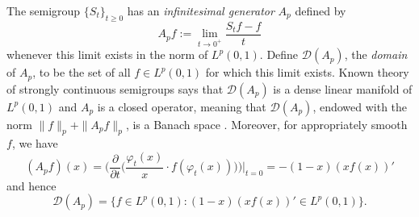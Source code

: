 \documentclass[11pt]{amsart}
\numberwithin{equation}{section}
\theoremstyle{plain}
\theoremstyle{definition}
\renewcommand{\leq}{\leqslant}
\renewcommand{\geq}{\geqslant}
\renewcommand{\phi}{\varphi}
\newcommand{\0}{{\color{lightgray}0}}
\begin{document}
The semigroup $\{S_t\}_{t \geq 0}$ has an  {\em infinitesimal generator} $A_p$ defined by 
$$A_p f := \lim_{t \to 0^{+}} \frac{S_{t} f - f}{t}$$ whenever this limit exists in the norm of $L^p(0, 1)$. Define $\mathcal{D}(A_p)$, the {\em domain} of $A_p$, to be the set of all $f \in L^p(0, 1)$ for which this limit exists. Known theory of strongly continuous semigroups says that $\mathcal{D}(A_p)$ is a dense linear manifold of $L^p(0, 1)$  and $A_p$ is a closed operator, meaning that $\mathcal{D}(A_p)$, endowed with the norm $\|f\|_{p} + \|A_{p} f\|_{p}$, is a Banach space \cite[Ch.~ 2, \S 10]{MR629828}. Moreover,  for appropriately smooth $f$, we have 
\begin{equation}\label{AAAaa}
(A_p f)(x) =\Big( \frac{\partial}{\partial t}\Big( \frac{\phi_{t}(x)}{x} \cdot f(\phi_{t}(x))\Big)\Big)\Big|_{t = 0} = - (1 - x)(x f(x))'
\end{equation} and hence 
\begin{equation}\label{666FFAris}
\mathcal{D}(A_p) = \{f \in L^p(0, 1): (1 - x)(x f(x))' \in L^p(0, 1)\}.
\end{equation}
\end{document}

